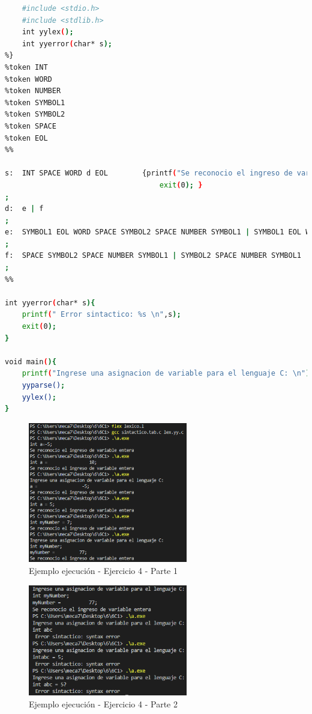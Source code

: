 \documentclass[12pt]{article}
\begin{document}
\begin{lstlisting}[language=bash,frame=single,style=CStyle,caption={sintactico.y}]
%{
    #include <stdio.h>
    #include <stdlib.h>
    int yylex();
    int yyerror(char* s);
%}
%token INT 
%token WORD
%token NUMBER
%token SYMBOL1
%token SYMBOL2
%token SPACE
%token EOL
%%

s:  INT SPACE WORD d EOL        {printf("Se reconocio el ingreso de variable entera\n");
                                    exit(0); }
;
d:  e | f 
;
e:  SYMBOL1 EOL WORD SPACE SYMBOL2 SPACE NUMBER SYMBOL1 | SYMBOL1 EOL WORD SYMBOL2 NUMBER SYMBOL1 | SYMBOL1 EOL WORD SYMBOL2 SPACE NUMBER SYMBOL1 | SYMBOL1 EOL WORD SPACE SYMBOL2 NUMBER SYMBOL1  
;
f:  SPACE SYMBOL2 SPACE NUMBER SYMBOL1 | SYMBOL2 SPACE NUMBER SYMBOL1 | SPACE SYMBOL2 NUMBER SYMBOL1 | SYMBOL2 NUMBER SYMBOL1
;
%%

int yyerror(char* s){
    printf(" Error sintactico: %s \n",s);
    exit(0);
}

void main(){
    printf("Ingrese una asignacion de variable para el lenguaje C: \n");
    yyparse();
    yylex();
}
\end{lstlisting}

\clearpage
\newpage

\begin{figure}[h]
    \centering
    \includegraphics[width=0.62\textwidth]{images/Capture004A.PNG}
    \caption{Ejemplo ejecución - Ejercicio 4 - Parte 1}
\end{figure}

\begin{figure}[h]
    \centering
    \includegraphics[width=0.62\textwidth]{images/Capture004B.PNG}
    \caption{Ejemplo ejecución - Ejercicio 4 - Parte 2}
\end{figure}
    
\end{document}
